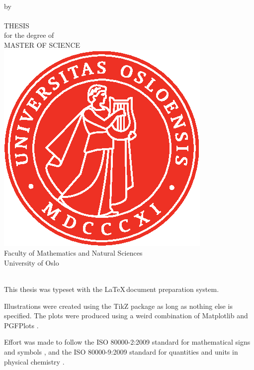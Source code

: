 \thispagestyle{empty}
\begin{center} \vspace{1cm}
    \textbf{\Large{\mtitle}}\\ \vspace{0.5cm}
    \small{by}\\ \vspace{0.5cm}
    \large{\mauthor}\\ \vspace{4.4cm}
    \large{THESIS}\\ \vspace{0.3cm}
    \small{for the degree of}\\ \vspace{0.3cm}
    \large{MASTER OF SCIENCE}\\ \vspace{0.7cm}
    \includegraphics[scale=1.0]{Images/UiO_Segl_pms485.eps} \\ \vspace{0.5cm}
    \large{Faculty of Mathematics and Natural Sciences \\ University of Oslo} \\ \vspace{0.5cm}
    \small{\mdate}\\ \vfill
\end{center}
\newpage
\vspace*{\fill}
{\setlength{\parindent}{0cm}
This thesis was typeset with the \LaTeX\,document preparation system.\bigskip

Illustrations were created using the TikZ package \cite{tantau_graph_2013} as long as nothing else is specified. The plots were produced using a weird combination of Matplotlib \cite{hunter_matplotlib:_2007} and PGFPlots \cite{tantau_graph_2013}.\bigskip

Effort was made to follow the ISO 80000-2:2009 standard for mathematical signs and symbols \cite{iso/tc_12_iso_nodate}, and the ISO 80000-9:2009 standard for quantities and units in physical chemistry \cite{iso/tc_12_iso_nodate-1}.
} 
\newpage
